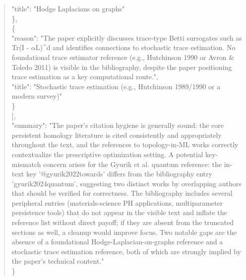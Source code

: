\documentclass[11pt]{article}
\begin{document}
\begin{quote}
      "title": "Hodge Laplacians on graphs"\\
    \},\\
    \{\\
      "reason": "The paper explicitly discusses trace-type Betti surrogates such as Tr(I - \ensuremath{\alpha}L)\^{}d and identifies connections to stochastic trace estimation. No foundational trace estimator reference (e.g., Hutchinson 1990 or Avron \& Toledo 2011) is visible in the bibliography, despite the paper positioning trace estimation as a key computational route.",\\
      "title": "Stochastic trace estimation (e.g., Hutchinson 1989/1990 or a modern survey)"\\
    \}\\
  ],\\
  "summary": "The paper's citation hygiene is generally sound: the core persistent homology literature is cited consistently and appropriately throughout the text, and the references to topology-in-ML works correctly contextualize the prescriptive optimization setting. A potential key-mismatch concern arises for the Gyurik et al. quantum reference: the in-text key '@gyurik2022towards' differs from the bibliography entry 'gyurik2024quantum', suggesting two distinct works by overlapping authors that should be verified for correctness. The bibliography includes several peripheral entries (materials-science PH applications, multiparameter persistence tools) that do not appear in the visible text and inflate the reference list without direct payoff; if they are absent from the truncated sections as well, a cleanup would improve focus. Two notable gaps are the absence of a foundational Hodge-Laplacian-on-graphs reference and a stochastic trace estimation reference, both of which are strongly implied by the paper's technical content."\\
\}\\
\end{quote}
\end{document}
